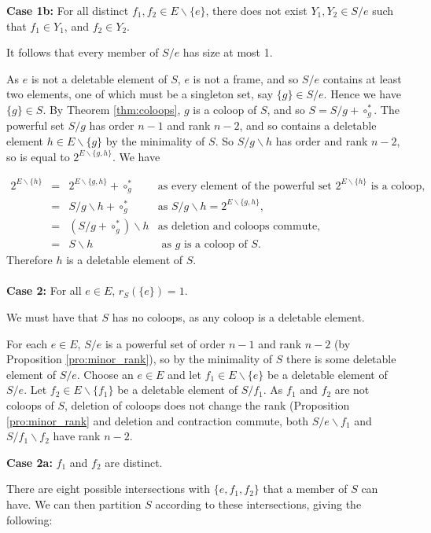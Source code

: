 \documentclass[10pt]{article}
\theoremstyle{definition}
\begin{document}
  \textbf{Case 1b:} For all distinct $f_1,f_2\in E\backslash\{e\}$, there does not exist $Y_1,Y_2\in S/e$ such that $f_1\in Y_1$, and $f_2\in Y_2$.
  
  It follows that every member of $S/{e}$ has size at most 1. 
  
 As $e$ is not a deletable element of $S$, $e$ is not a frame, and so $S/e$ contains at least two elements, one of which must be a singleton set, say $\{g\}\in S/{e}$. Hence we have $\{g\}\in S$. By Theorem \ref{thm:coloops}, $g$ is a coloop of $S$, and so $S= S/g +\circ_g^*$. The powerful set $S/g$ has order $n-1$ and rank $n-2$, and so contains a deletable element $h\in E\backslash\{g\}$ by the minimality of $S$. So $S/g\backslash{h}$ has order and rank $n-2$, so is equal to $2^{E\backslash\{g,h\}}$. We have
 
\[
 \begin{array}{lllr}
  2^{E\backslash\{h\}}&=&2^{E\backslash\{g,h\}}+\circ_g^*&\text{as every element of the powerful set $2^{E\backslash\{h\}}$ is a coloop,}\\
  &=& S/g\backslash{h}+\circ_g^* & \text{as $S/g\backslash{h}=2^{E\backslash\{g,h\}}$,}\\
  &=& (S/g+\circ_g^*)\backslash{h} &\text{as deletion and coloops commute,}\\
  &=& S\backslash{h} &\text{ as $g$ is a coloop of $S$.}
 \end{array}
 \]
Therefore $h$ is a deletable element of $S$.\\~\\ 
 \noindent\textbf{Case 2:} For all $e\in E$, $r_S(\{e\})=1$.
 
We must have that $S$ has no coloops, as any coloop is a deletable element.
 
For each $e\in E$, $S/e$ is a powerful set of order $n-1$ and rank ${n-2}$ (by Proposition \ref{pro:minor_rank}), so by the minimality of $S$ there is some deletable element of $S/e$. Choose an $e\in E$ and let $f_1\in E\backslash \{e\}$ be a deletable element of $S/e$. Let $f_2\in E\backslash \{f_1\}$ be a deletable element of $S/f_1$. As $f_1$ and $f_2$ are not coloops of $S$, deletion of coloops does not change the rank (Proposition \ref{pro:minor_rank} and deletion and contraction commute,  both $S/e\backslash{f_1}$ and $S/f_1\backslash{f_2}$ have rank $n-2$. 
 
 \textbf{Case 2a:} $f_1$ and $f_2$ are distinct.
 
There are eight possible intersections with $\{e,f_1,f_2\}$ that a member of $S$ can have. We can then partition $S$ according to these intersections, giving the following:
\end{document}
